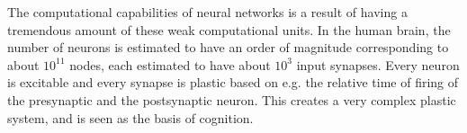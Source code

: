 		The computational capabilities of neural networks is a result of having a tremendous amount of these weak computational units.
		In the human brain, the number of neurons is estimated to have an order of magnitude corresponding to about $10^{11}$ nodes, each estimated to have about $10^3$ input synapses.
		Every neuron is excitable and every synapse is plastic based on e.g. the relative time of firing of the presynaptic and the postsynaptic neuron.
		This creates a very complex plastic system, and is seen as the basis of cognition.


